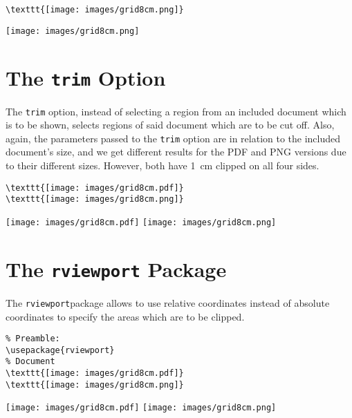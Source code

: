 \documentclass[a4paper,11pt]{article}
\newcommand\code[1]{\texttt{#1}}
\begin{document}
\begin{verbatim}
\texttt{[image: images/grid8cm.png]}
\end{verbatim}

\texttt{[image: images/grid8cm.png]}


\newpage
\section{The \code{trim} Option}

The  \code{trim}  option, instead  of  selecting  a  region from  an  included
document which is to  be shown, selects regions of said  document which are to
be cut off. Also,  again, the parameters passed to the  \code{trim} option are
in relation to the included document's  size, and we get different results for
the PDF  and PNG  versions due  to their  different sizes. However,  both have
\SI{1}{\centi\meter} clipped on all four sides.

\begin{verbatim}
\texttt{[image: images/grid8cm.pdf]}
\texttt{[image: images/grid8cm.png]}
\end{verbatim}

\noindent\texttt{[image: images/grid8cm.pdf]}
\texttt{[image: images/grid8cm.png]}


\newpage
\section{The \code{rviewport} Package}
\label{sec:rviewport}

The \code{rviewport}\footnotemark  package allows to use  relative coordinates
instead of absolute coordinates to specify the areas which are to be clipped.


\begin{verbatim}
% Preamble:
\usepackage{rviewport}
% Document
\texttt{[image: images/grid8cm.pdf]}
\texttt{[image: images/grid8cm.png]}
\end{verbatim}

\texttt{[image: images/grid8cm.pdf]}
\texttt{[image: images/grid8cm.png]}
\end{document}
